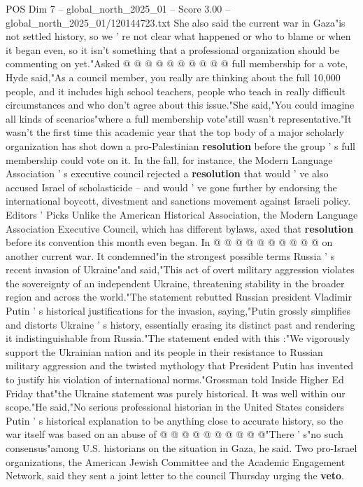 \begin{textsample}{POS Dim 7 – global\_north\_2025\_01 – Score 3.00 – global\_north\_2025\_01/120144723.txt}
She also said the current war in Gaza"is not settled history, so we ' re not clear what happened or who to blame or when it began even, so it isn't something that a professional organization should be commenting on yet."Asked @ @ @ @ @ @ @ @ @ @ full membership for a vote, Hyde said,"As a council member, you really are thinking about the full 10,000 people, and it includes high school teachers, people who teach in really difficult circumstances and who don't agree about this issue."She said,"You could imagine all kinds of scenarios"where a full membership vote"still wasn't representative."It wasn't the first time this academic year that the top body of a major scholarly organization has shot down a pro-Palestinian \textbf{resolution} before the group ' s full membership could vote on it.
In the fall, for instance, the Modern Language Association ' s executive council rejected a \textbf{resolution} that would ' ve also accused Israel of scholasticide -- and would ' ve gone further by endorsing the international boycott, divestment and sanctions movement against Israeli policy.
Editors ' Picks Unlike the American Historical Association, the Modern Language Association Executive Council, which has different bylaws, axed that \textbf{resolution} before its convention this month even began.
In @ @ @ @ @ @ @ @ @ @ on another current war.
It condemned"in the strongest possible terms Russia ' s recent invasion of Ukraine"and said,"This act of overt military aggression violates the sovereignty of an independent Ukraine, threatening stability in the broader region and across the world."The statement rebutted Russian president Vladimir Putin ' s historical justifications for the invasion, saying,"Putin grossly simplifies and distorts Ukraine ' s history, essentially erasing its distinct past and rendering it indistinguishable from Russia."The statement ended with this :"We vigorously support the Ukrainian nation and its people in their resistance to Russian military aggression and the twisted mythology that President Putin has invented to justify his violation of international norms."Grossman told Inside Higher Ed Friday that"the Ukraine statement was purely historical.
It was well within our scope."He said,"No serious professional historian in the United States considers Putin ' s historical explanation to be anything close to accurate history, so the war itself was based on an abuse of @ @ @ @ @ @ @ @ @ @"There ' s"no such consensus"among U.S. historians on the situation in Gaza, he said.
Two pro-Israel organizations, the American Jewish Committee and the Academic Engagement Network, said they sent a joint letter to the council Thursday urging the \textbf{veto}.

\end{textsample}
